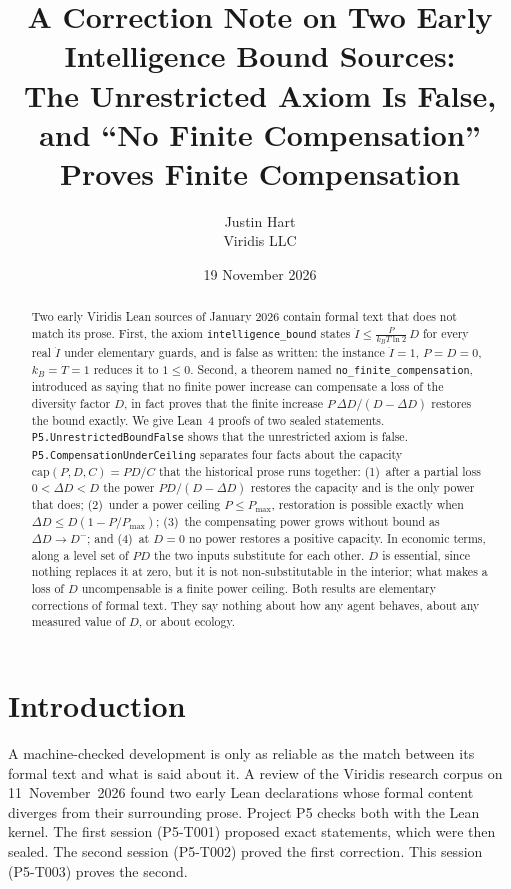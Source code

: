 \documentclass[11pt]{article}
\title{A Correction Note on Two Early Intelligence Bound Sources:\\
The Unrestricted Axiom Is False, and ``No Finite Compensation'' Proves Finite Compensation}
\author{Justin Hart\\Viridis LLC}
\date{19 November 2026}
\theoremstyle{remark}
\begin{document}
\maketitle

\begin{abstract}
Two early Viridis Lean sources of January 2026 contain formal text that does not match its
prose. First, the axiom \texttt{intelligence\_bound} states
$\dot I\le \frac{P}{k_B T\ln 2}\,D$ for every real $\dot I$ under elementary guards, and is false
as written: the instance $\dot I=1$, $P=D=0$, $k_B=T=1$ reduces it to $1\le0$. Second, a theorem
named \texttt{no\_finite\_compensation}, introduced as saying that no finite power increase can
compensate a loss of the diversity factor $D$, in fact proves that the finite increase
$P\,\Delta D/(D-\Delta D)$ restores the bound exactly. We give Lean~4 proofs of two sealed
statements. \texttt{P5.UnrestrictedBoundFalse} shows that the unrestricted axiom is false.
\texttt{P5.CompensationUnderCeiling} separates four facts about the capacity
$\mathrm{cap}(P,D,C)=PD/C$ that the historical prose runs together: (1)~after a partial loss
$0<\Delta D<D$ the power $PD/(D-\Delta D)$ restores the capacity and is the only power that does;
(2)~under a power ceiling $P\le P_{\max}$, restoration is possible exactly when
$\Delta D\le D(1-P/P_{\max})$; (3)~the compensating power grows without bound as
$\Delta D\to D^-$; and (4)~at $D=0$ no power restores a positive capacity. In economic terms,
along a level set of $PD$ the two inputs substitute for each other. $D$ is essential, since
nothing replaces it at zero, but it is not non-substitutable in the interior; what makes a loss of
$D$ uncompensable is a finite power ceiling. Both results are elementary corrections of formal
text. They say nothing about how any agent behaves, about any measured value of $D$, or about
ecology.
\end{abstract}

\section{Introduction}
A machine-checked development is only as reliable as the match between its formal text and what
is said about it. A review of the Viridis research corpus on 11~November~2026 found two early Lean
declarations whose formal content diverges from their surrounding prose. Project P5 checks both
with the Lean kernel. The first session (P5-T001) proposed exact statements, which were then
sealed. The second session (P5-T002) proved the first correction. This session (P5-T003) proves
the second.
\end{document}
